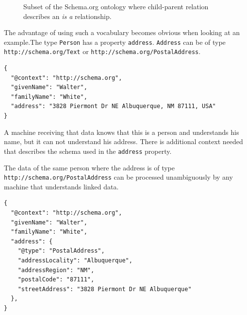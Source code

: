 \begin{figure}[!htb]
  \caption{\label{fig:schemaorg} Subset of the Schema.org ontology where child-parent relation describes an \textit{is a} relationship.}
\end{figure}

The advantage of using such a vocabulary becomes obvious when looking at an example.The type \lstinline{Person} has a property \lstinline{address}. \lstinline{Address} can be of type \lstinline{http://schema.org/Text} or \lstinline{http://schema.org/PostalAddress}.

\lstset{language=JSON}
\begin{lstlisting}[caption=A person with an address of type Text]
{
  "@context": "http://schema.org",
  "givenName": "Walter",
  "familyName": "White",
  "address": "3828 Piermont Dr NE Albuquerque, NM 87111, USA"
}
\end{lstlisting}

A machine receiving that data knows that this is a person and understands his name, but it can not understand his address. There is additional context needed that describes the schema used in the \lstinline{address} property.

The data of the same person where the address is of type \lstinline{http://schema.org/PostalAddress} can be processed unambiguously by any machine that understands linked data.

\lstset{language=JSON}
\begin{lstlisting}[caption=A person with an address of type PostalAddress]
{
  "@context": "http://schema.org",
  "givenName": "Walter",
  "familyName": "White",
  "address": {
    "@type": "PostalAddress",
    "addressLocality": "Albuquerque",
    "addressRegion": "NM",
    "postalCode": "87111",
    "streetAddress": "3828 Piermont Dr NE Albuquerque"
  },
}
\end{lstlisting}


